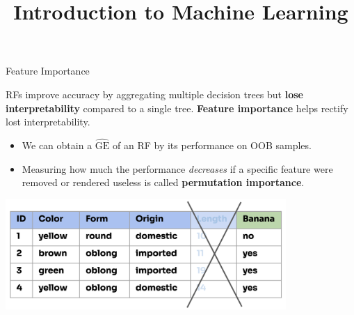 \documentclass[11pt,compress,t,notes=noshow, xcolor=table]{beamer}
\title{Introduction to Machine Learning}
\begin{document}

\begin{vbframe}{Feature Importance}

RFs improve accuracy by aggregating multiple decision trees but \textbf{lose interpretability} compared to a single tree. \textbf{Feature importance} helps rectify lost interpretability.
\\
\begin{itemize}
  \item We can obtain a $\widehat{\mathrm{GE}}$ of an RF by its performance on OOB samples.
  \item Measuring how much the performance \textit{decreases} if a specific feature were removed or rendered useless is called \textbf{permutation importance}.
\end{itemize}

\vspace{-1ex}
\begin{center}
\includegraphics[width=0.8\textwidth]{figure_man/forest-fimp_idea.png}
\end{center}

\end{vbframe}
\end{document}
